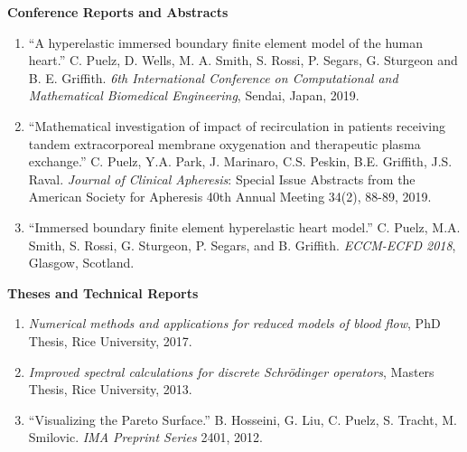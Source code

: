 \documentclass{article} %
\begin{document}

\vspace{0.5cm}
\noindent
{\bf \large Conference Reports and Abstracts}
\begin{enumerate}
\item ``A hyperelastic immersed boundary finite element model of the human heart.'' C. Puelz, D. Wells, M. A. Smith, S. Rossi, P. Segars, G. Sturgeon and B. E. Griffith. {\em 6th International Conference on Computational and Mathematical Biomedical Engineering}, Sendai, Japan, 2019.  
\item ``Mathematical investigation of impact of recirculation in patients receiving tandem extracorporeal membrane oxygenation and therapeutic plasma exchange.'' C. Puelz, Y.A. Park, J. Marinaro, C.S. Peskin, B.E. Griffith, J.S. Raval. {\em Journal of Clinical Apheresis}: Special Issue Abstracts from the American Society for Apheresis 40th Annual Meeting 34(2), 88-89, 2019.
\item ``Immersed boundary finite element hyperelastic heart model.'' C. Puelz, M.A. Smith, S. Rossi, G. Sturgeon, P. Segars, and B. Griffith. {\em ECCM-ECFD 2018}, Glasgow, Scotland.
\end{enumerate}

\vspace{0.5cm}
\noindent
{\bf \large Theses and Technical Reports}
\begin{enumerate}
\item {\em Numerical methods and applications for reduced models of blood flow}, PhD Thesis, Rice University, 2017.
\item {\em Improved spectral calculations for discrete Schr\"odinger operators}, Masters Thesis, Rice University, 2013.
\item ``Visualizing the Pareto Surface.'' B. Hosseini, G. Liu, C. Puelz, S. Tracht, M. Smilovic. {\em IMA Preprint Series} 2401, 2012.
\end{enumerate}
\end{document}
